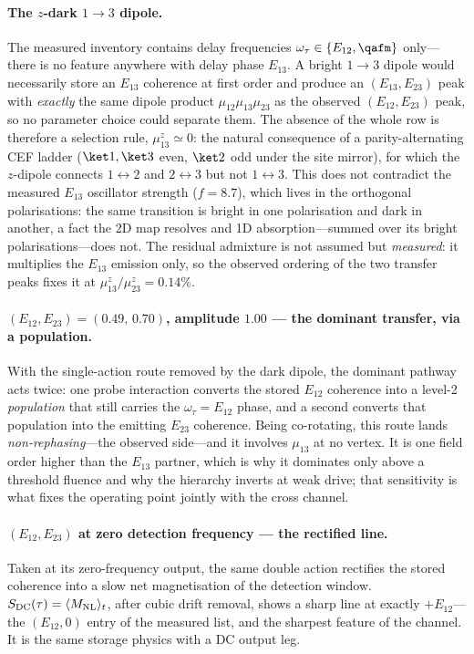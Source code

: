 \paragraph{The $z$-dark $1\to3$ dipole.}
The measured inventory contains delay frequencies
$\omega_\tau\in\{E_{12},\qafm\}$ only---there is no feature anywhere
with delay phase $E_{13}$.  A bright $1\!\to\!3$ dipole would
necessarily store an $E_{13}$ coherence at first order and produce an
$(E_{13},E_{23})$ peak with \emph{exactly} the same dipole product
$\mu_{12}\mu_{13}\mu_{23}$ as the observed $(E_{12},E_{23})$ peak, so
no parameter choice could separate them.  The absence of the whole row
is therefore a selection rule, $\mu^z_{13}\simeq0$: the natural
consequence of a parity-alternating CEF ladder ($\ket1,\ket3$ even,
$\ket2$ odd under the site mirror), for which the $z$-dipole connects
$1\!\leftrightarrow\!2$ and $2\!\leftrightarrow\!3$ but not
$1\!\leftrightarrow\!3$.  This does not contradict the measured
$E_{13}$ oscillator strength ($f=8.7$), which lives in the orthogonal
polarisations: the same transition is bright in one polarisation and
dark in another, a fact the 2D map resolves and 1D absorption---summed
over its bright polarisations---does not.  The residual admixture is
not assumed but \emph{measured}: it multiplies the $E_{13}$ emission
only, so the observed ordering of the two transfer peaks fixes it at
$\mu^z_{13}/\mu^z_{23}=0.14\%$.

\paragraph{$(E_{12},E_{23})=(0.49,\,0.70)$, amplitude $1.00$ --- the
dominant transfer, via a population.}
With the single-action route removed by the dark dipole, the dominant
pathway acts twice: one probe interaction converts the stored $E_{12}$
coherence into a level-2 \emph{population} that still carries the
$\omega_\tau=E_{12}$ phase, and a second converts that population into
the emitting $E_{23}$ coherence.  Being co-rotating, this route lands
\emph{non-rephasing}---the observed side---and it involves $\mu_{13}$
at no vertex.  It is one field order higher than the $E_{13}$ partner,
which is why it dominates only above a threshold fluence and why the
hierarchy inverts at weak drive; that sensitivity is what fixes the
operating point jointly with the cross channel.

\paragraph{$(E_{12},E_{23})$ at zero detection frequency --- the
rectified line.}
Taken at its zero-frequency output, the same double action rectifies
the stored coherence into a slow net magnetisation of the detection
window.  $S_{\rm DC}(\tau)=\langle M_{\rm NL}\rangle_t$, after cubic
drift removal, shows a sharp line at exactly $+E_{12}$---the
$(E_{12},0)$ entry of the measured list, and the sharpest feature of
the channel.  It is the same storage physics with a DC output leg.

